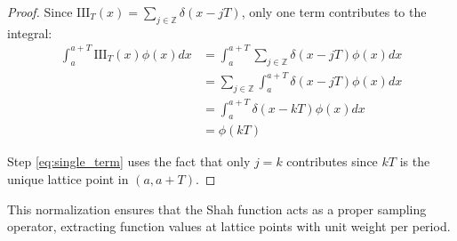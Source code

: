 \documentclass{article}
\begin{document}
\begin{proof}
Since $\text{III}_T(x) = \sum_{j \in \mathbb{Z}} \delta(x - jT)$, only one term contributes to the integral:
\begin{align}
\int_{a}^{a+T} \text{III}_T(x) \phi(x) dx &= \int_{a}^{a+T} \sum_{j \in \mathbb{Z}} \delta(x - jT) \phi(x) dx \label{eq:expand_integral}\\
&= \sum_{j \in \mathbb{Z}} \int_{a}^{a+T} \delta(x - jT) \phi(x) dx \label{eq:interchange_sum_integral_norm}\\
&= \int_{a}^{a+T} \delta(x - kT) \phi(x) dx \label{eq:single_term}\\
&= \phi(kT) \label{eq:sifting_normalization}
\end{align}

Step \eqref{eq:single_term} uses the fact that only $j = k$ contributes since $kT$ is the unique lattice point in $(a, a+T)$.
\end{proof}

This normalization ensures that the Shah function acts as a proper sampling operator, extracting function values at lattice points with unit weight per period.
\end{document}
